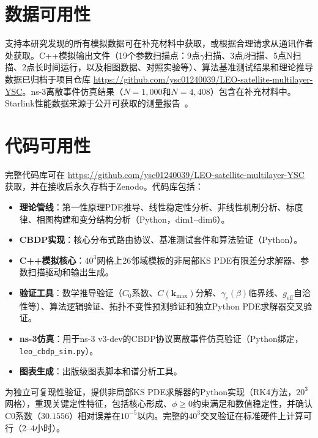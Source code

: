 \documentclass[sn-nature,pdflatex]{sn-jnl}
\begin{document}
\section*{数据可用性}
支持本研究发现的所有模拟数据可在补充材料中获取，或根据合理请求从通讯作者处获取。C++模拟输出文件（19个参数扫描点：9点$\gamma$扫描、3点$\beta$扫描、5点N扫描、2点长时间运行，以及相图数据、对照实验等）、算法基准测试结果和理论推导数据已归档于项目仓库 \url{https://github.com/ysc01240039/LEO-satellite-multilayer-YSC}。ns-3离散事件仿真结果（$N=1,000$和$N=4,408$）包含在补充材料中。Starlink性能数据来源于公开可获取的测量报告~\cite{starlink_2025_update,ookla_2025_starlink}。

\section*{代码可用性}
完整代码库可在 \url{https://github.com/ysc01240039/LEO-satellite-multilayer-YSC} 获取，并在接收后永久存档于Zenodo。代码库包括：
\begin{itemize}
  \item \textbf{理论管线}：第一性原理PDE推导、线性稳定性分析、非线性机制分析、标度律、相图构建和变分结构分析（Python，dim1--dim6）。
  \item \textbf{CBDP实现}：核心分布式路由协议、基准测试套件和算法验证（Python）。
  \item \textbf{C++模拟核心}：$40^3$网格上26邻域模板的非局部KS PDE有限差分求解器、参数扫描驱动和输出生成。
  \item \textbf{验证工具}：数学推导验证（$C_0$系数、$C(\mathbf{k}_{\max})$分解、$\gamma_c(\beta)$临界线、$g_{\text{eff}}$自洽性等）、算法逻辑验证、拓扑不变性预测验证和独立Python PDE求解器交叉验证。
  \item \textbf{ns-3仿真}：用于ns-3 v3-dev的CBDP协议离散事件仿真验证（Python绑定，\texttt{leo\_cbdp\_sim.py}）。
  \item \textbf{图表生成}：出版级图表脚本和谱分析工具。
\end{itemize}
为独立可复现性验证，提供非局部KS PDE求解器的Python实现（RK4方法，$20^3$网格），重现关键定性特征，包括核心形成、$\phi \ge 0$约束满足和数值稳定性，并确认C0系数（$30.1556$）相对误差在$10^{-5}$以内。完整的$40^3$交叉验证在标准硬件上计算可行（2--4小时）。


\end{document}
